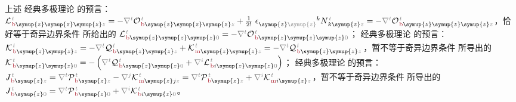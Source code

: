 上述 {\one} 经典多极理论  的预言：${\mathcal{L}}^{\;\!\mathcolor{gray}{t}}_{\;\!\textcolor{Maroon}{\text{b}} \symup{z} \symup{z} \symup{z} \mathcolor{gray}{z}} = - \mathcolor{gray}{\nabla^t} {\mathcal{O}}^{\;\!\mathcolor{gray}{t}}_{\;\!\textcolor{Maroon}{\text{b}} \symup{z} \symup{z} \symup{z} \mathcolor{gray}{z}} + \frac{1}{2!}~ \epsilon^{\hphantom{\symup{z} \symup{z}}k}_{\symup{z} \mathcolor{gray}{\symup{z}}} N^{\;\!\mathcolor{gray}{t}}_{\;\! k\symup{z}\mathcolor{gray}{z}} = - \mathcolor{gray}{\nabla^t} {\mathcal{O}}^{\;\!\mathcolor{gray}{t}}_{\;\!\textcolor{Maroon}{\text{b}} \symup{z} \symup{z} \symup{z} \mathcolor{gray}{z}}$，恰好等于奇异边界条件  所给出的 ${\mathcal{L}}^{\;\!\mathcolor{gray}{t}}_{\;\!\textcolor{Maroon}{\text{b}} \symup{z} \symup{z} \symup{z} \mathcolor{gray}{0}} = - \mathcolor{gray}{\nabla^t} {\mathcal{O}}^{\;\!\mathcolor{gray}{t}}_{\;\!\textcolor{Maroon}{\text{b}} \symup{z} \symup{z} \symup{z} \mathcolor{gray}{0}}$；{\two} 经典多极理论  的预言：${\mathcal{K}}^{\;\!\mathcolor{gray}{t}}_{\;\!\textcolor{Maroon}{\text{b}} \symup{z} \symup{z} \mathcolor{gray}{z}} = - \mathcolor{gray}{\nabla^t} {\mathcal{Q}}^{\;\!\mathcolor{gray}{t}}_{\;\!\textcolor{Maroon}{\text{b}} \symup{z} \symup{z} \mathcolor{gray}{z}} + {\mathcal{K}}^{\;\!\mathcolor{gray}{t}}_{\;\!\textcolor{Maroon}{\text{m}} \symup{z} \symup{z} \mathcolor{gray}{z}} = - \mathcolor{gray}{\nabla^t} {\mathcal{Q}}^{\;\!\mathcolor{gray}{t}}_{\;\!\textcolor{Maroon}{\text{b}} \symup{z} \symup{z} \mathcolor{gray}{z}}$，暂不等于奇异边界条件  所导出的 ${\mathcal{K}}^{\;\!\mathcolor{gray}{t}}_{\;\!\textcolor{Maroon}{\text{b}} \symup{z} \symup{z} \mathcolor{gray}{0}} = - \left( \mathcolor{gray}{\nabla^t} {\mathcal{Q}}^{\;\!\mathcolor{gray}{t}}_{\;\!\textcolor{Maroon}{\text{b}} \symup{z} \symup{z} \mathcolor{gray}{0}} + \mathcolor{gray}{\nabla^i} {\mathcal{L}}^{\;\!\mathcolor{gray}{t}}_{\;\!\textcolor{Maroon}{\text{b}} i\symup{z} \symup{z} \mathcolor{gray}{0}} \right)$；{\three} 经典多极理论  的预言：${J}^{\;\!\mathcolor{gray}{t}}_{\;\!\textcolor{Maroon}{\text{b}} \symup{z} \mathcolor{gray}{z}} = \mathcolor{gray}{\nabla^t} {\mathcal{P}}^{\;\!\mathcolor{gray}{t}}_{\;\!\textcolor{Maroon}{\text{b}} \symup{z} \mathcolor{gray}{z}} - \mathcolor{gray}{\nabla^j} {\mathcal{K}}^{\;\!\mathcolor{gray}{t}}_{\;\!\textcolor{Maroon}{\text{m}} \symup{z}j \mathcolor{gray}{z}} = \mathcolor{gray}{\nabla^t} {\mathcal{P}}^{\;\!\mathcolor{gray}{t}}_{\;\!\textcolor{Maroon}{\text{b}} \symup{z} \mathcolor{gray}{z}} + \mathcolor{gray}{\nabla^i} {\mathcal{K}}^{\;\!\mathcolor{gray}{t}}_{\;\!\textcolor{Maroon}{\text{m}} i\symup{z} \mathcolor{gray}{z}}$，暂不等于奇异边界条件  所导出的 ${J}^{\;\!\mathcolor{gray}{t}}_{\;\!\textcolor{Maroon}{\text{b}} \symup{z} \mathcolor{gray}{0}} = \mathcolor{gray}{\nabla^t} {\mathcal{P}}^{\;\!\mathcolor{gray}{t}}_{\;\!\textcolor{Maroon}{\text{b}} \symup{z} \mathcolor{gray}{0}} + \mathcolor{gray}{\nabla^i} {\mathcal{K}}^{\;\!\mathcolor{gray}{t}}_{\;\!\textcolor{Maroon}{\text{b}} i\symup{z}\mathcolor{gray}{0}}$。

